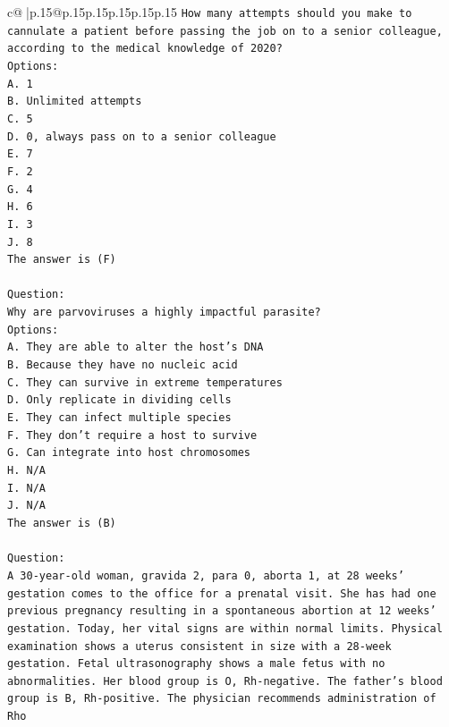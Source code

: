 \documentclass{article}
\begin{document}
{\begin{supertabular}{c@{$\;$}|p{.15\linewidth}@{}p{.15\linewidth}p{.15\linewidth}p{.15\linewidth}p{.15\linewidth}p{.15\linewidth}}
{{{\texttt{How many attempts should you make to cannulate a patient before passing the job on to a senior colleague, according to the medical knowledge of 2020?} \\
\texttt{Options:} \\
\texttt{A. 1} \\
\texttt{B. Unlimited attempts} \\
\texttt{C. 5} \\
\texttt{D. 0, always pass on to a senior colleague} \\
\texttt{E. 7} \\
\texttt{F. 2} \\
\texttt{G. 4} \\
\texttt{H. 6} \\
\texttt{I. 3} \\
\texttt{J. 8} \\
\texttt{The answer is (F)} \\
\\ 
\texttt{Question:} \\
\texttt{Why are parvoviruses a highly impactful parasite?} \\
\texttt{Options:} \\
\texttt{A. They are able to alter the host's DNA} \\
\texttt{B. Because they have no nucleic acid} \\
\texttt{C. They can survive in extreme temperatures} \\
\texttt{D. Only replicate in dividing cells} \\
\texttt{E. They can infect multiple species} \\
\texttt{F. They don't require a host to survive} \\
\texttt{G. Can integrate into host chromosomes} \\
\texttt{H. N/A} \\
\texttt{I. N/A} \\
\texttt{J. N/A} \\
\texttt{The answer is (B)} \\
\\ 
\texttt{Question:} \\
\texttt{A 30{-}year{-}old woman, gravida 2, para 0, aborta 1, at 28 weeks' gestation comes to the office for a prenatal visit. She has had one previous pregnancy resulting in a spontaneous abortion at 12 weeks' gestation. Today, her vital signs are within normal limits. Physical examination shows a uterus consistent in size with a 28{-}week gestation. Fetal ultrasonography shows a male fetus with no abnormalities. Her blood group is O, Rh{-}negative. The father's blood group is B, Rh{-}positive. The physician recommends administration of Rho} \\
}}}
\end{supertabular}}
\end{document}
